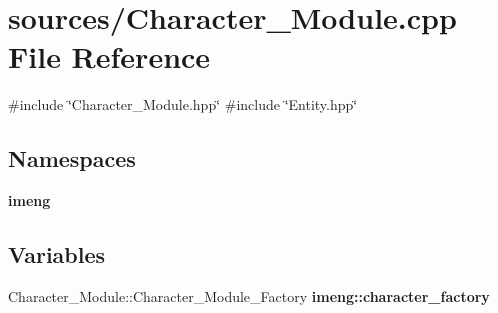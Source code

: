 \section{sources/\+Character\+\_\+\+Module.cpp File Reference}
\label{_character___module_8cpp}
{\ttfamily \#include \char`\"{}Character\+\_\+\+Module.\+hpp\char`\"{}}\newline
{\ttfamily \#include \char`\"{}Entity.\+hpp\char`\"{}}\newline
\subsection*{Namespaces}
\begin{DoxyCompactItemize}
\item 
 \textbf{ imeng}
\end{DoxyCompactItemize}
\subsection*{Variables}
\begin{DoxyCompactItemize}
\item 
Character\+\_\+\+Module\+::\+Character\+\_\+\+Module\+\_\+\+Factory \textbf{ imeng\+::character\+\_\+factory}
\end{DoxyCompactItemize}
